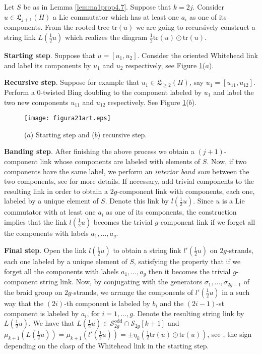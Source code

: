 \documentclass[10pt]{amsart}
\numberwithin{equation}{section}
\numberwithin{equation}{section}
\theoremstyle{definition}
\begin{document}
 Let $S$ be as in Lemma \ref{lemma1prop4.7}. Suppose that $k=2j$. Consider $u\in\mathfrak{L}_{j+1}(H)$ a Lie commutator which  has at least one $a_i$ as one of its components. From the rooted tree $\text{tr}(u)$ we are going to recursively construct  a string link $L(\frac{1}{2}u)$ which realizes the diagram $\frac{1}{2}\text{tr}(u)\odot \text{tr}(u)$.

\textbf{Starting step}. Suppose that $u=[u_1,u_2]$. Consider the oriented  Whitehead link  and label its components by $u_1$ and $u_2$ respectively, see Figure \ref{figura21}($a$).

\textbf{Recursive step}. Suppose for example that $u_1\in\mathfrak{L}_{\geq 2}(H)$, say $u_1=[u_{11},u_{12}]$. Perform a $0$-twisted Bing doubling to the component labeled by $u_1$ and label the two new components $u_{11}$ and $u_{12}$ respectively. See Figure \ref{figura21}($b$).
\begin{figure}[ht!]
										\centering
                        \texttt{[image: figura21art.eps]}
												\caption{($a$) Starting step and ($b$) recursive step.}
												\label{figura21}
\end{figure}

\textbf{Banding step}. After finishing the above process we obtain a $(j+1)$-component link  whose components are labeled with elements of  $S$. Now, if two components have the same label, we perform an \emph{interior band sum} between the two components, see \cite[Section 7]{MR1042041} for more details. If necessary, add trivial components to the resulting link in order to obtain a $2g$-component link with components, each one, labeled by a unique element of $S$. Denote this link by $l(\frac{1}{2}u)$. Since $u$ is a Lie commutator with at least one $a_i$ as one of its components, the construction  implies that the  link $l(\frac{1}{2}u)$ becomes the trivial $g$-component  link if we forget all the components with labels $a_1,\ldots,a_g$.

\textbf{Final step}. Open the link $l(\frac{1}{2}u)$ to obtain a string link $l'(\frac{1}{2}u)$ on $2g$-strands, each one labeled by a unique element of $S$, satisfying  the property that if we forget all the components with labels $a_1,\ldots,a_g$ then it becomes the trivial $g$-component   string link. Now, by conjugating with the generators $\sigma_1,\ldots,\sigma_{2g-1}$ of the braid group on $2g$-strands, we  arrange the components of $l'(\frac{1}{2}u)$ in a such way  that the  $(2i)$-th component is labeled by $b_i$ and the $(2i-1)$-st component is labeled by $a_i$, for $i=1,\ldots,g$. Denote the resulting string link by $L(\frac{1}{2}u)$. We have that $L(\frac{1}{2}u)\in\mathcal{S}^{\text{odd}}_{2g}\cap\mathcal{S}_{2g}[k+1]$ and $\mu_{k+1}(L(\frac{1}{2}u))=\mu_{k+1}(l'(\frac{1}{2}u))=\pm\eta_k(\frac{1}{2}\text{tr}(u)\odot \text{tr}(u))$, see \cite[Remark 8.2]{MR1783857}, the sign depending on the clasp of the Whitehead link in the starting step.
\end{document}

